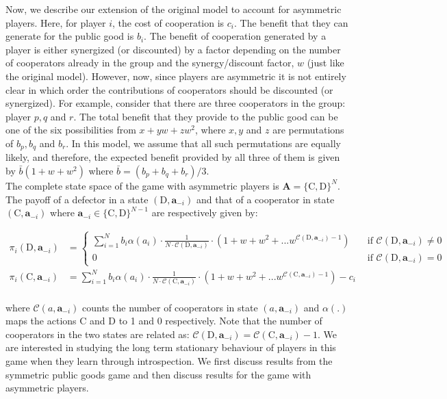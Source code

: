 \documentclass[11pt]{article}
\theoremstyle{plainCl1}
\theoremstyle{plainCl2}
\newcommand{\A}{\mathbf{A}}
\newcommand{\abf}{\mathbf{a}}
\newcommand{\C}{\mathrm{C}}
\newcommand{\D}{\mathrm{D}}
\begin{document}
\noindent Now, we describe our extension of the original model to account for asymmetric players. Here, for player $i$, the cost of cooperation is $c_i$. The benefit that they can generate for the public good is $b_i$. The benefit of cooperation generated by a player is either synergized (or discounted) by a factor depending on the number of cooperators already in the group and the synergy/discount factor, $w$ (just like the original model). However, now, since players are asymmetric it is not entirely clear in which order the contributions of cooperators should be discounted (or synergized). For example, consider that there are three cooperators in the group: player $p, q$ and $r$. The total benefit that they provide to the public good can be one of the six possibilities from $x + y w + z w^2$, where $x,y$ and $z$ are permutations  of $b_p, b_q$ and $b_r$. In this model, we assume that all such permutations are equally likely, and therefore, the expected benefit provided by all three of them is given by $\bar{b}(1 + w + w^2)$ where $\bar{b} = (b_p + b_q + b_r)/3$. \\ 

\noindent The complete state space of the game with asymmetric players is $\A = \{\C,\D\}^N$. The payoff of a defector in a state $(\D, \abf_{-i})$ and that of a cooperator in state $(\C,\abf_{-i})$ where $\abf_{-i} \in \{\C,\D\}^{N-1}$ are respectively given by:

\begin{align}
\pi_i(\D, \abf_{-i})&= 
\begin{cases}
\displaystyle \sum_{i=1}^N b_i \alpha(a_i) \cdot \frac{1}{N \cdot \mathcal{C}(\D,\abf_{-i})} \cdot \left(1 + w + w^2 + ...w^{\mathcal{C}(\D,\abf_{-i}) - 1} \right) &\quad  \text{if } \mathcal{C}(\D,\abf_{-i}) \neq 0 \\[15pt]
0 &\quad  \text{if } \mathcal{C}(\D,\abf_{-i}) = 0
\end{cases} \\[15pt]
\pi_i(\C, \abf_{-i}) &= \displaystyle \sum_{i=1}^N b_i \alpha(a_i) \cdot \frac{1}{N \cdot \mathcal{C}(\C,\abf_{-i})} \cdot \left(1 + w + w^2 + ...w^{\mathcal{C}(\C,\abf_{-i}) - 1} \right) - c_i
\label{Eq:payoff-synergistic-asymmetric}
\end{align} \\
\noindent where $\mathcal{C}(a,\abf_{-i})$ counts the number of cooperators in state $(a,\abf_{-i})$ and $\alpha(.)$ maps the actions $\C$ and $\D$ to 1 and 0 respectively. Note that the number of cooperators in the two states are related as: $\mathcal{C}(\D,\abf_{-i}) = \mathcal{C}(\C,\abf_{-i}) - 1$. We are interested in studying the long term stationary behaviour of players in this game when they learn through introspection. We first discuss results from the symmetric public goods game and then discuss results for the game with asymmetric players.\\
\end{document}
